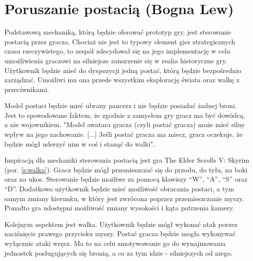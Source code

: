 \section{Poruszanie postacią (Bogna Lew)}\label{s:por_proj}
Podstawową mechaniką, którą będzie oferować prototyp gry, jest sterowanie postacią przez gracza. Chociaż nie jest
to typowy element gier strategicznych czasu rzeczywistego, to zespół zdecydował się na jego implementację w celu umożliwienia
graczowi na silniejsze zanurzenie się w realia historyczne gry. Użytkownik będzie
mieć do dyspozycji jedną postać, którą będzie bezpośrednio zarządzać. Umożliwi mu ona przede wszystkim eksplorację
świata oraz walkę z przeciwnikami.

Model postaci będzie mieć ubrany pancerz i nie będzie posiadać żadnej broni. Jest to spowodowane faktem, że zgodnie z
zamysłem gry gracz ma być dowódcą, a nie wojownikiem. "Model awatara gracza (czyli postać gracza) może mieć silny wpływ
na jego zachowanie. [...] Jeśli postać gracza ma miecz, gracz oczekuje, że będzie mógł uderzyć nim w coś i stanąć do
walki"\cite{projektowanie_gier}. 

Inspiracją dla mechaniki sterowania postacią jest gra The Elder Scrolls V: Skyrim (por. \ref{s:walka}). Gracz będzie mógł przemieszczać się
do przodu, do tyłu, na boki oraz na ukos. Sterowanie będzie możliwe za pomocą klawiszy  “W”, “A”, “S” oraz “D”.
Dodatkowo użytkownik będzie mieć możliwość obracania postaci, a tym samym zmiany kierunku, w który jest zwrócona poprzez
przemieszczanie myszy. Ponadto gra udostępni możliwość zmiany wysokości i kąta patrzenia kamery.

Kolejnym aspektem jest walka. Użytkownik będzie mógł wykonać atak porzez naciśnięcie prawego przycisku myszy. Postać
gracza będzie mogła wykonywać wyłącznie ataki wręcz. Ma to na celu zmotywowanie go do wynajmowania jednostek posługujących
się bronią, a co za tym idzie - silniejszych od niego.